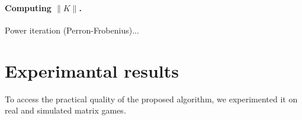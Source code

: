\documentclass{article} %
\begin{document}

\paragraph{\textbf{Computing $\|K\|$.}} Power iteration (Perron-Frobenius)...

\section{Experimantal results}
\label{sec:results}
To access the practical quality of the proposed algorithm, we
experimented it on real and simulated matrix games.
\end{document}
